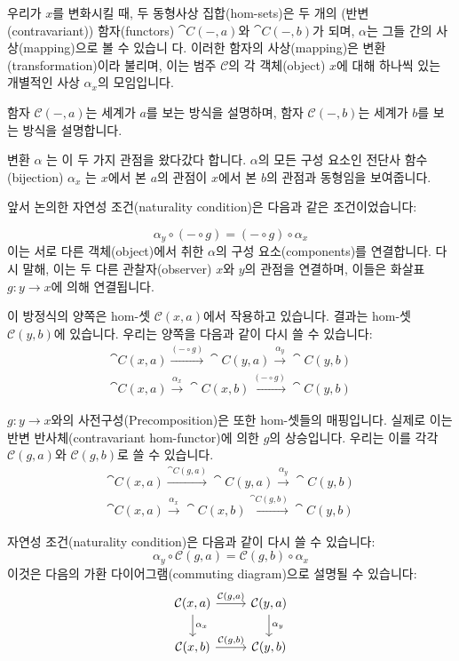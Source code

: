 \documentclass[DaoFP]{subfiles}
\begin{document}
우리가 $x$를 변화시킬 때, 두 동형사상 집합(hom-sets)은 두 개의 (반변(contravariant)) 함자(functors) $\cat C(-, a)$와 $\cat C(-, b)$가 되며, $\alpha$는 그들 간의 사상(mapping)으로 볼 수 있습니 다. 이러한 함자의 사상(mapping)은 변환(transformation)이라 불리며, 이는 범주 $\mathcal{C}$의 각 객체(object) $x$에 대해 하나씩 있는 개별적인 사상 $\alpha_x$의 모임입니다.

함자 $\mathcal{C}(-, a)$는 세계가 $a$를 보는 방식을 설명하며, 함자 $\mathcal{C}(-, b)$는 세계가 $b$를 보는 방식을 설명합니다.

변환 $\alpha$ 는 이 두 가지 관점을 왔다갔다 합니다. $\alpha$의 모든 구성 요소인 전단사 함수(bijection) $\alpha_x$ 는 $x$에서 본 $a$의 관점이 $x$에서 본 $b$의 관점과 동형임을 보여줍니다.

앞서 논의한 자연성 조건(naturality condition)은 다음과 같은 조건이었습니다:

\[ \alpha_y \circ (- \circ g) = (- \circ g) \circ \alpha_x \]
이는 서로 다른 객체(object)에서 취한 $\alpha$의 구성 요소(components)를 연결합니다. 다시 말해, 이는 두 다른 관찰자(observer) $x$와 $y$의 관점을 연결하며, 이들은 화살표 $g \colon y \to x$에 의해 연결됩니다.

이 방정식의 양쪽은 hom-셋 $\mathcal{C}(x, a)$에서 작용하고 있습니다. 결과는 hom-셋 $\mathcal{C}(y, b)$에 있습니다. 우리는 양쪽을 다음과 같이 다시 쓸 수 있습니다:
\begin{align*}
 \cat C(x, a) \xrightarrow{(- \circ g)} \cat C(y, a) \xrightarrow{\alpha_y} \cat C(y, b) \\
\cat C(x, a) \xrightarrow{\alpha_x}  \cat C(x, b)  \xrightarrow{(- \circ g)}\cat C(y, b)
\end{align*}

$g \colon y \to x$와의 사전구성(Precomposition)은 또한 hom-셋들의 매핑입니다. 실제로 이는 반변 반사체(contravariant hom-functor)에 의한 $g$의 상승입니다. 우리는 이를 각각 $\mathcal{C}(g, a)$와 $\mathcal{C}(g, b)$로 쓸 수 있습니다.
\begin{align*}
 \cat C(x, a) \xrightarrow{\cat C(g, a)} \cat C(y, a) \xrightarrow{\alpha_y} \cat C(y, b) \\
\cat C(x, a) \xrightarrow{\alpha_x}  \cat C(x, b)  \xrightarrow{\cat C(g, b)}\cat C(y, b)
\end{align*}

자연성 조건(naturality condition)은 다음과 같이 다시 쓸 수 있습니다:
\[ \alpha_y \circ \mathcal{C}(g, a) = \mathcal{C}(g, b) \circ \alpha_x \]
이것은 다음의 가환 다이어그램(commuting diagram)으로 설명될 수 있습니다:
\[
 \begin{tikzcd}
 \mathcal{C}(x, a)
 \arrow[d, "\alpha_x"]
 \arrow[r, "{\mathcal{C}(g, a)}"]
 &
 \mathcal{C}(y, a)
  \arrow[d, "\alpha_y"]
 \\
 \mathcal{C}(x, b)
 \arrow[r, "{\mathcal{C}(g, b)}"]
& \mathcal{C}(y, b)
 \end{tikzcd}
\]
\end{document}
